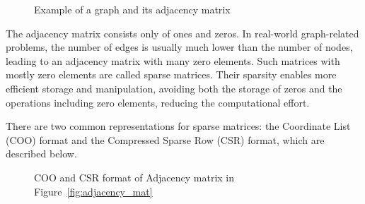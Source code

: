 \begin{figure}[t]
    \centering
    \hspace{0.15\textwidth}
    \caption{Example of a graph and its adjacency matrix}
    \label{fig:graph_adjacency}
\end{figure}

The adjacency matrix consists only of ones and zeros.
In real-world graph-related problems, the number of edges is usually much lower than the number of nodes, leading to an adjacency matrix with many zero elements.
Such matrices with mostly zero elements are called sparse matrices.
Their sparsity enables more efficient storage and manipulation, avoiding both the storage of zeros and the operations including zero elements, reducing the computational effort.

There are two common representations for sparse matrices: the Coordinate List (COO) format and the Compressed Sparse Row (CSR) format, which are described below.

\begin{figure}[t]
    \centering
    \hspace{0.15\textwidth}
    \caption{COO and CSR format of Adjacency matrix in Figure~\ref{fig:adjacency_mat}}
    \label{fig:coo_csr}
\end{figure}

